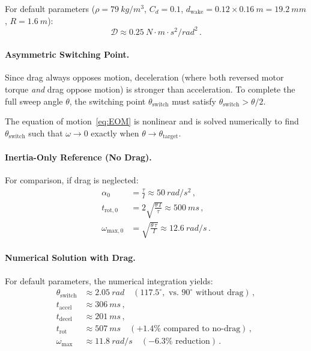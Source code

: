 \documentclass[11pt,a4paper]{article}
\begin{document}
For default parameters ($\rho = \SI{79}{kg/m^3}$, $C_d = 0.1$,
$d_\mathrm{wake} = 0.12 \times \SI{0.16}{m} = \SI{19.2}{mm}$,
$R = \SI{1.6}{m}$):
\begin{equation}
  \mathcal{D} \approx \SI{0.25}{N\cdot m\cdot s^2/rad^2}\,.
\end{equation}

\paragraph{Asymmetric Switching Point.}
Since drag always opposes motion, deceleration (where both reversed
motor torque \emph{and} drag oppose motion) is stronger than
acceleration. To complete the full sweep angle $\theta$, the switching
point $\theta_\mathrm{switch}$ must satisfy $\theta_\mathrm{switch} > \theta/2$.

The equation of motion~\eqref{eq:EOM} is nonlinear and is solved
numerically to find $\theta_\mathrm{switch}$ such that
$\omega \to 0$ exactly when $\theta \to \theta_\mathrm{target}$.

\paragraph{Inertia-Only Reference (No Drag).}
For comparison, if drag is neglected:
\begin{align}
  \alpha_0 &= \frac{\tau}{I} \approx \SI{50}{rad/s^2}\,,
  \label{eq:alpha} \\
  t_\mathrm{rot,0} &= 2\sqrt{\frac{\theta\, I}{\tau}}
    \approx \SI{500}{ms}\,,
  \label{eq:trot0} \\
  \omega_\mathrm{max,0} &= \sqrt{\frac{\theta\,\tau}{I}}
    \approx \SI{12.6}{rad/s}\,.
  \label{eq:omega_max0}
\end{align}

\paragraph{Numerical Solution with Drag.}
For default parameters, the numerical integration yields:
\begin{align}
  \theta_\mathrm{switch} &\approx \SI{2.05}{rad}
    \quad (117.5^\circ, \text{ vs.\ } 90^\circ \text{ without drag})\,,
  \label{eq:theta_switch} \\
  t_\mathrm{accel} &\approx \SI{306}{ms}\,,
  \label{eq:taccel} \\
  t_\mathrm{decel} &\approx \SI{201}{ms}\,,
  \label{eq:tdecel} \\
  t_\mathrm{rot} &\approx \SI{507}{ms}
    \quad (+1.4\% \text{ compared to no-drag})\,,
  \label{eq:trot} \\
  \omega_\mathrm{max} &\approx \SI{11.8}{rad/s}
    \quad (-6.3\% \text{ reduction})\,.
  \label{eq:omega_max}
\end{align}
\end{document}
